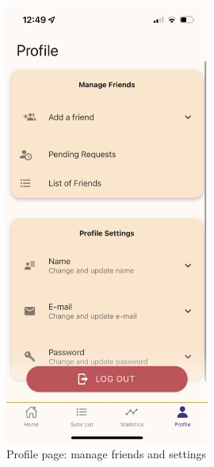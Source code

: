 \documentclass[11pt]{article}
\begin{document}
\begin{figure}[h!]
\begin{minipage}[c]{0.45\textwidth}
        \includegraphics[width=0.6\textwidth, clip]{../../assets/smartphone/profile.PNG}
        \caption{Profile page: manage friends and settings}
        \label{fig:profile}
    \end{minipage}
\end{figure}
\end{document}
